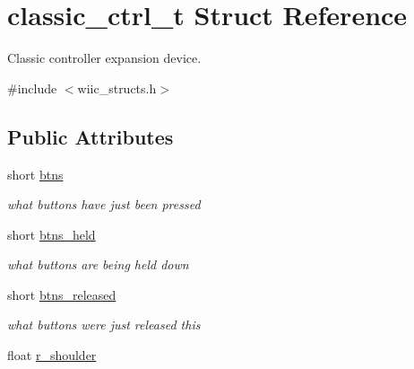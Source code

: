 \hypertarget{structclassic__ctrl__t}{\section{classic\-\_\-ctrl\-\_\-t \-Struct \-Reference}
\label{structclassic__ctrl__t}
}


\-Classic controller expansion device.  




{\ttfamily \#include $<$wiic\-\_\-structs.\-h$>$}

\subsection*{\-Public \-Attributes}
\begin{DoxyCompactItemize}
\item 
\hypertarget{structclassic__ctrl__t_a6035a8a1bea040f9e2ee8847e86450fd}{short \hyperlink{structclassic__ctrl__t_a6035a8a1bea040f9e2ee8847e86450fd}{btns}}\label{structclassic__ctrl__t_a6035a8a1bea040f9e2ee8847e86450fd}

\begin{DoxyCompactList}\small\item\em what buttons have just been pressed \end{DoxyCompactList}\item 
\hypertarget{structclassic__ctrl__t_a5a2241beaae82ad81a653ffb2df74be3}{short \hyperlink{structclassic__ctrl__t_a5a2241beaae82ad81a653ffb2df74be3}{btns\-\_\-held}}\label{structclassic__ctrl__t_a5a2241beaae82ad81a653ffb2df74be3}

\begin{DoxyCompactList}\small\item\em what buttons are being held down \end{DoxyCompactList}\item 
\hypertarget{structclassic__ctrl__t_a1e692fc1a2696dc63c8bd1f63d5c1e21}{short \hyperlink{structclassic__ctrl__t_a1e692fc1a2696dc63c8bd1f63d5c1e21}{btns\-\_\-released}}\label{structclassic__ctrl__t_a1e692fc1a2696dc63c8bd1f63d5c1e21}

\begin{DoxyCompactList}\small\item\em what buttons were just released this \end{DoxyCompactList}\item 
\hypertarget{structclassic__ctrl__t_aa3957631edebe03ac120c847b11ff7da}{float \hyperlink{structclassic__ctrl__t_aa3957631edebe03ac120c847b11ff7da}{r\-\_\-shoulder}}\label{structclassic__ctrl__t_aa3957631edebe03ac120c847b11ff7da}


\end{DoxyCompactItemize}
